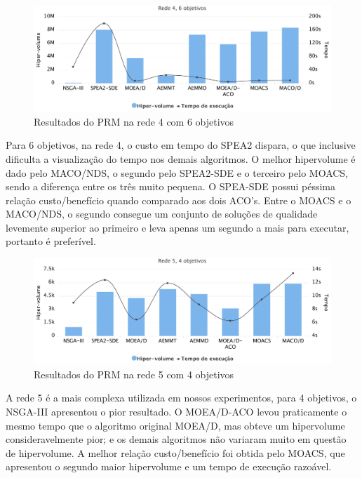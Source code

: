 \begin{figure}[!htbp]	
	\includegraphics[width=1\textwidth]{cap_experimentos/figs/etapa4/r4o6}
	\caption{\label{fig_exp4_r4o6}Resultados do PRM na rede 4 com 6 objetivos}
\end{figure}

Para 6 objetivos, na rede 4, o custo em tempo do SPEA2 dispara, o que inclusive dificulta a visualização do tempo nos demais algoritmos. O melhor hipervolume é dado pelo MACO/NDS, o segundo pelo SPEA2-SDE e o terceiro pelo MOACS, sendo a  diferença entre os três muito pequena. O SPEA-SDE possui péssima relação custo/benefício quando comparado aos dois ACO's. Entre o MOACS e o MACO/NDS, o segundo consegue um conjunto de soluções de qualidade levemente superior ao primeiro e leva apenas um segundo a mais para executar, portanto é preferível.

\begin{figure}[!htbp]
	\includegraphics[width=1\textwidth]{cap_experimentos/figs/etapa4/r5o4}
	\caption{\label{fig_exp4_r5o4}Resultados do PRM na rede 5 com 4 objetivos}
\end{figure}

A rede 5 é a mais complexa utilizada em nossos experimentos, para 4 objetivos, o NSGA-III apresentou o pior resultado. O MOEA/D-ACO levou praticamente o mesmo tempo que o algoritmo original MOEA/D, mas obteve um hipervolume consideravelmente pior; e os demais algoritmos não variaram muito em questão de hipervolume. A melhor relação custo/benefício foi obtida pelo MOACS, que apresentou o segundo maior hipervolume e um tempo de execução razoável.

